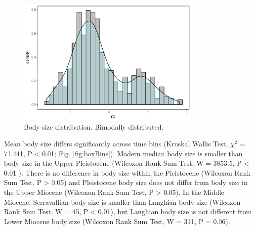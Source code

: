 




\begin{figure}[htbp]
	\centering
	\includegraphics[width=0.8\textwidth]{MA_JJ_files/figure-latex/HistAll-1.pdf}
	\caption[CL distribution]{Body size distribution. Bimodally distributed.}
	\label{fig:histAll}
\end{figure}


Mean body size differs significantly across time bins (Kruskal Wallis Test, $\chi^2$ = 71.441, P < 0.01; Fig. \ref{fig:boxBins}). Modern median body size is smaller than body size in the Upper Pleistocene (Wilcoxon Rank Sum Test, W = 3853.5, P < 0.01 ). There is no difference in body size within the Pleistocene (Wilcoxon Rank Sum Test, P > 0.05) and Pleistocene body size does not differ from body size in the Upper Miocene (Wilcoxon Rank Sum Test, P > 0.05). In the Middle Miocene, Serravallian body size is smaller than Langhian body size (Wilcoxon Rank Sum Test, W = 45, P < 0.01), but Langhian body size is not different from Lower Miocene body size (Wilcoxon Rank Sum Test, W = 311, P = 0.06).

\FloatBarrier






